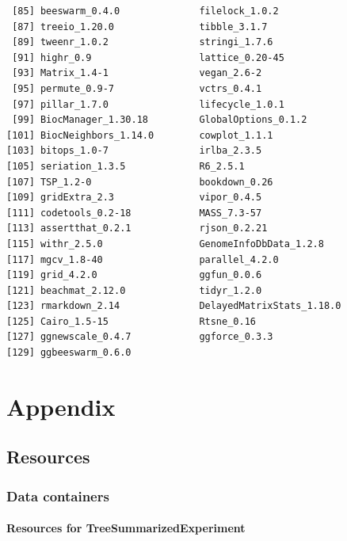 \documentclass[
]{book}
\begin{document}
\begin{verbatim}
 [85] beeswarm_0.4.0              filelock_1.0.2             
 [87] treeio_1.20.0               tibble_3.1.7               
 [89] tweenr_1.0.2                stringi_1.7.6              
 [91] highr_0.9                   lattice_0.20-45            
 [93] Matrix_1.4-1                vegan_2.6-2                
 [95] permute_0.9-7               vctrs_0.4.1                
 [97] pillar_1.7.0                lifecycle_1.0.1            
 [99] BiocManager_1.30.18         GlobalOptions_0.1.2        
[101] BiocNeighbors_1.14.0        cowplot_1.1.1              
[103] bitops_1.0-7                irlba_2.3.5                
[105] seriation_1.3.5             R6_2.5.1                   
[107] TSP_1.2-0                   bookdown_0.26              
[109] gridExtra_2.3               vipor_0.4.5                
[111] codetools_0.2-18            MASS_7.3-57                
[113] assertthat_0.2.1            rjson_0.2.21               
[115] withr_2.5.0                 GenomeInfoDbData_1.2.8     
[117] mgcv_1.8-40                 parallel_4.2.0             
[119] grid_4.2.0                  ggfun_0.0.6                
[121] beachmat_2.12.0             tidyr_1.2.0                
[123] rmarkdown_2.14              DelayedMatrixStats_1.18.0  
[125] Cairo_1.5-15                Rtsne_0.16                 
[127] ggnewscale_0.4.7            ggforce_0.3.3              
[129] ggbeeswarm_0.6.0           
\end{verbatim}

\hypertarget{part-appendix}{%
\part{Appendix}\label{part-appendix}}

\hypertarget{resources}{%
\chapter{Resources}\label{resources}}

\hypertarget{data-containers-1}{%
\section{Data containers}\label{data-containers-1}}

\hypertarget{resources-for-treesummarizedexperiment}{%
\subsection{Resources for TreeSummarizedExperiment}\label{resources-for-treesummarizedexperiment}}
\end{document}
